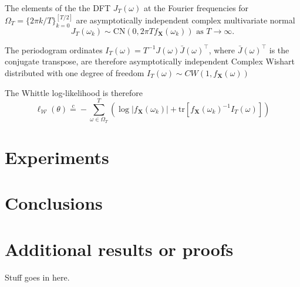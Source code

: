 \documentclass[11pt,oneside,english]{amsart}
\numberwithin{equation}{section}
\numberwithin{figure}{section}
\theoremstyle{plain}
\numberwithin{equation}{section}
\begin{document}
The elements of the the DFT $J_T(\omega)$ at the Fourier frequencies for 
$\Omega_T = \{2\pi k/T\}_{k=0}^{[T/2]}$ are asymptotically independent complex multivariate normal 
\citep{brillinger2001time}
\begin{equation}
    J_T(\omega_k) \sim \mathrm{CN}(0,2\pi T f_{\mathbf{X}}(\omega_k)) \text{ as } T\rightarrow \infty.
\end{equation}

The periodogram ordinates $I_T(\omega) = T^{-1}J(\omega)\bar{J}(\omega)^\top$, where $\bar{J}(\omega)^\top$
is the conjugate transpose, are therefore asymptotically 
independent Complex Wishart distributed with one degree of freedom $I_T(\omega) \sim 
CW(1,f_{\mathbf{X}}(\omega))$

The Whittle log-likelihood is therefore
\begin{equation*}
    \ell_\mathcal{W}(\theta) \overset{c}{=} - \sum_{\omega\in\Omega_T}^T \left( \log | f_{\mathbf{X}}(\omega_k)| 
     + \mathrm{tr}\left[f_{\mathbf{X}}(\omega_k)^{-1}I_T(\omega)\right] \right)
\end{equation*}


\section{Experiments}

\section{Conclusions}





\appendix

\section{Additional results or proofs}
Stuff goes in here.
\end{document}
